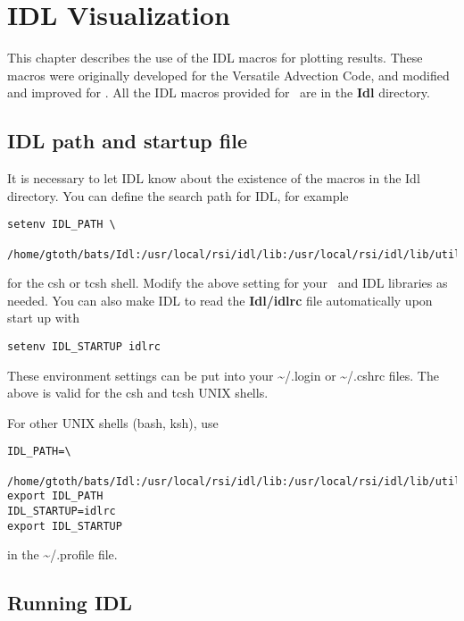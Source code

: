 %

\section{IDL Visualization \label{section:idl_visualization}}

This chapter describes the use of the IDL macros for plotting results.
These macros were originally developed for the Versatile Advection Code,
and modified and improved for \BATSRUS. 
All the IDL macros provided for \BATSRUS\ are in the {\bf Idl} directory.

\subsection{IDL path and startup file \label{s-idl-path}}

   It is necessary to let IDL know about the existence of the macros in the 
   Idl directory.  You can define the search path for IDL, for example
\begin{verbatim}
setenv IDL_PATH \
 /home/gtoth/bats/Idl:/usr/local/rsi/idl/lib:/usr/local/rsi/idl/lib/utilities
\end{verbatim}
   for the csh or tcsh shell. Modify the above setting for
   your \BATSRUS\ and IDL libraries as needed. You can also make IDL to read 
   the {\bf Idl/idlrc} file automatically upon start up with
\begin{verbatim}
setenv IDL_STARTUP idlrc
\end{verbatim}
   These environment settings can be put into your \~{}/.login or \~{}/.cshrc 
   files. The above is valid for the csh and tcsh UNIX shells. 

   For other UNIX shells (bash, ksh), use
\begin{verbatim}
IDL_PATH=\
 /home/gtoth/bats/Idl:/usr/local/rsi/idl/lib:/usr/local/rsi/idl/lib/utilities
export IDL_PATH
IDL_STARTUP=idlrc
export IDL_STARTUP
\end{verbatim}
   in the \~{}/.profile file.

\subsection{Running IDL \label{s-run-idl}}

